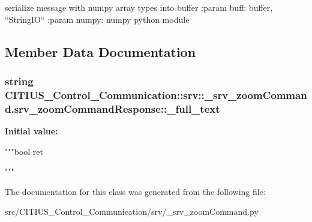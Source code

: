\begin{DoxyVerb}
serialize message with numpy array types into buffer
:param buff: buffer, ``StringIO``
:param numpy: numpy python module
\end{DoxyVerb}
 

\subsection{\-Member \-Data \-Documentation}
\hypertarget{class_c_i_t_i_u_s___control___communication_1_1srv_1_1__srv__zoom_command_1_1srv__zoom_command_response_ad3915d70298a147c033baa00087336df}{
\subsubsection[{\-\_\-full\-\_\-text}]{\setlength{\rightskip}{0pt plus 5cm}string \-C\-I\-T\-I\-U\-S\-\_\-\-Control\-\_\-\-Communication\-::srv\-::\-\_\-srv\-\_\-zoom\-Command.\-srv\-\_\-zoom\-Command\-Response\-::\-\_\-full\-\_\-text}}\label{class_c_i_t_i_u_s___control___communication_1_1srv_1_1__srv__zoom_command_1_1srv__zoom_command_response_ad3915d70298a147c033baa00087336df}
{\bfseries \-Initial value\-:}
\begin{DoxyCode}
"""bool ret


"""
\end{DoxyCode}


\-The documentation for this class was generated from the following file\-:\begin{DoxyCompactItemize}
\item 
src/\-C\-I\-T\-I\-U\-S\-\_\-\-Control\-\_\-\-Communication/srv/\-\_\-srv\-\_\-zoom\-Command.\-py\end{DoxyCompactItemize}
